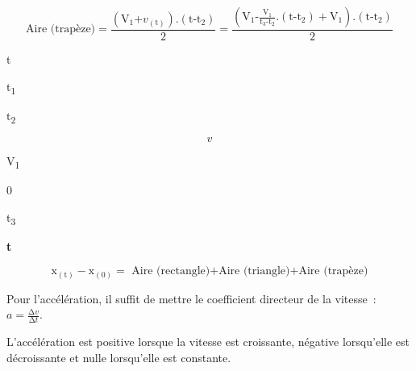 \[\text{Aire}\text{ (trapèze)} = \frac{\left( \text{V}_{\text{1}}\text{+}v_{\left( \text{t} \right)} \right)\text{.}\left( \text{t-}\text{t}_{\text{2}} \right)}{\text{2}} = \frac{\left( \text{V}_{\text{1}}\text{-}\frac{\text{V}_{\text{1}}}{\text{t}_{\text{3}}\text{-}\text{t}_{\text{2}}}\text{.}\left( \text{t-}\text{t}_{\text{2}} \right) + \text{V}_{\text{1}} \right)\text{.}\left( \text{t-}\text{t}_{\text{2}} \right)}{\text{2}}\]

t

t\textsubscript{1}

t\textsubscript{2}

\[v\]

V\textsubscript{1}

0

t\textsubscript{3}

\textbf{t}

\[\text{x}_{\left( \text{t} \right)} - \text{x}_{(0)} = \text{ Aire}\text{ (rectangle)+}\text{Aire}\text{ (triangle)+}\text{Aire}\text{ (trapèze)}\]

Pour l'accélération, il suffit de mettre le coefficient directeur de la
vitesse~: \(a = \frac{\mathrm{\Delta}v}{\mathrm{\Delta}t}\).

L'accélération est positive lorsque la vitesse est croissante, négative
lorsqu'elle est décroissante et nulle lorsqu'elle est constante.

